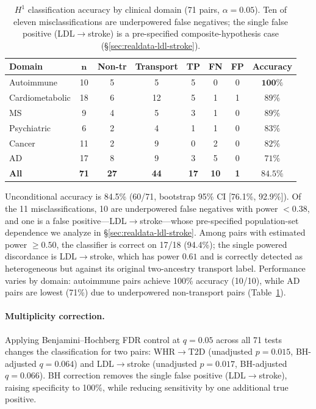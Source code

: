 \documentclass[11pt]{article}
\begin{document}
\begin{table}[t]
\centering
\caption{$H^1$ classification accuracy by clinical domain (71 pairs, $\alpha = 0.05$). Ten of eleven misclassifications are underpowered false negatives; the single false positive (LDL$\to$stroke) is a pre-specified composite-hypothesis case (\S\ref{sec:realdata-ldl-stroke}).}
\label{tab:realdata-domain}
\small
\begin{tabular}{@{}lccccccc@{}}
\toprule
\textbf{Domain} & $\boldsymbol{n}$ & \textbf{Non-tr} & \textbf{Transport} & \textbf{TP} & \textbf{FN} & \textbf{FP} & \textbf{Accuracy} \\
\midrule
Autoimmune & 10 & 5 & 5 & 5 & 0 & 0 & $\mathbf{100\%}$ \\
Cardiometabolic & 18 & 6 & 12 & 5 & 1 & 1 & $89\%$ \\
MS & 9 & 4 & 5 & 3 & 1 & 0 & $89\%$ \\
Psychiatric & 6 & 2 & 4 & 1 & 1 & 0 & $83\%$ \\
Cancer & 11 & 2 & 9 & 0 & 2 & 0 & $82\%$ \\
AD & 17 & 8 & 9 & 3 & 5 & 0 & $71\%$ \\
\midrule
\textbf{All} & \textbf{71} & \textbf{27} & \textbf{44} & \textbf{17} & \textbf{10} & \textbf{1} & $\mathbf{84.5\%}$ \\
\bottomrule
\end{tabular}
\end{table}

Unconditional accuracy is 84.5\% (60/71, bootstrap 95\% CI [76.1\%, 92.9\%]). Of the 11 misclassifications, 10 are underpowered false negatives with power $< 0.38$, and one is a false positive---LDL$\to$stroke---whose pre-specified population-set dependence we analyze in \S\ref{sec:realdata-ldl-stroke}. Among pairs with estimated power $\geq 0.50$, the classifier is correct on 17/18 (94.4\%); the single powered discordance is LDL$\to$stroke, which has power $0.61$ and is correctly detected as heterogeneous but against its original two-ancestry transport label.
Performance varies by domain: autoimmune pairs achieve 100\% accuracy (10/10), while AD pairs are lowest (71\%) due to underpowered non-transport pairs (Table~\ref{tab:realdata-domain}).

\paragraph{Multiplicity correction.}
Applying Benjamini--Hochberg FDR control at $q = 0.05$ across all 71 tests changes the classification for two pairs: WHR$\to$T2D (unadjusted $p = 0.015$, BH-adjusted $q = 0.064$) and LDL$\to$stroke (unadjusted $p = 0.017$, BH-adjusted $q = 0.066$). BH correction removes the single false positive (LDL$\to$stroke), raising specificity to 100\%, while reducing sensitivity by one additional true positive.
\end{document}
